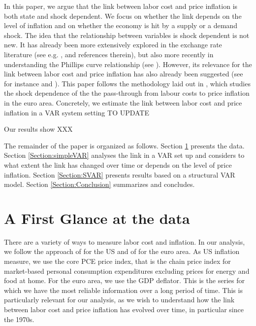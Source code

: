 \documentclass[11pt]{article}
\begin{document}
In this paper, we argue that the link between labor cost and price inflation is both state and shock dependent. We focus on whether the link depends on the level of inflation and on whether the economy is hit by a supply or a demand shock. The idea that the relationship between variables is shock dependent is not new. It has already been more extensively explored in the exchange rate literature (see e.g. \cite{Forbes_2018}, \cite{Comunale_Kunovac_2017} and references therein), but also more recently in understanding the Phillips curve relationship (see \cite{Gali_Gambetti_19}). However, its relevance for the link between labor cost and price inflation has also already been suggested (see for instance \cite{Hahn_Gumiel_18} and \cite{BCV19}). This paper follows the methodology laid out in \cite{BCV19}, which studies the shock dependence of the the pass-through from labour costs to price inflation in the euro area. Concretely, we estimate the link between labor cost and price inflation in a VAR system setting TO UPDATE 

Our results show XXX

The remainder of the paper is organized as follows. Section \ref{Section:Data} presents the data. Section \ref{Section:simpleVAR} analyses the link in a VAR set up and considers to what extent the link has changed over time or depends on the level of price inflation. Section \ref{Section:SVAR} presents results based on a structural VAR model. Section \ref{Section:Conclusion} summarizes and concludes.


\section{A First Glance at the data}
\label{Section:Data}

There are a variety of ways to measure labor cost and inflation. In our analysis, we follow the approach of \cite{Peneva_Rudd_2017} for the US and of \cite{BCV19} for the euro area. As US inflation measure, we use the core PCE price index, that is the chain price index for market-based personal consumption expenditures excluding prices for energy and food at home. For the euro area, we use the GDP deflator. This is the series for which we have the most reliable information over a long period of time. This is particularly relevant for our analysis, as we wish to understand how the link between labor cost and price inflation has evolved over time, in particular since the 1970s. 
\end{document}

